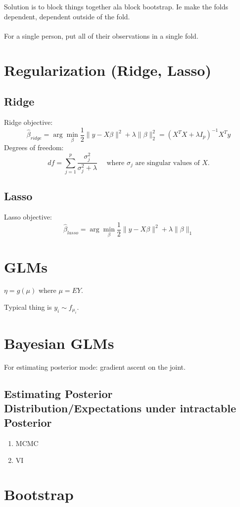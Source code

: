\documentclass{article}
\begin{document}
Solution is to block things together ala block bootstrap. Ie make the folds dependent, dependent outside of the fold. \\\\

For a single person, put all of their observations in a single fold. 
\section{Regularization (Ridge, Lasso)}
\subsection{Ridge}
Ridge objective:
$$\hat \beta_{ridge} = \arg \min _\beta \frac{1}{2} \|y - X\beta\|^2 + \lambda \|\beta\|_2^2 = (X^TX + \lambda I_p )^{-1}X^T y $$
Degrees of freedom:
$$df = \sum_{j=1}^p \frac{\sigma^2_j}{\sigma^2_j + \lambda} \quad \text{ where } \sigma_j \text{ are singular values of } X.$$  
\subsection{Lasso}

Lasso objective: 
$$\hat \beta_{lasso} = \arg \min _\beta \frac{1}{2} \|y - X\beta\|^2 + \lambda \|\beta\|_1$$ 

\newpage

\section{GLMs}

$\eta = g(\mu)$ where $\mu = EY$. 


Typical thing is $y_i \sim f_{\mu_i}$. 


\section{Bayesian GLMs}
For estimating posterior mode: gradient ascent on the joint. 

\subsection{Estimating Posterior Distribution/Expectations under intractable Posterior}
\begin{enumerate}
	\item MCMC
	\item VI 
\end{enumerate}
\section{Bootstrap}
\end{document}
